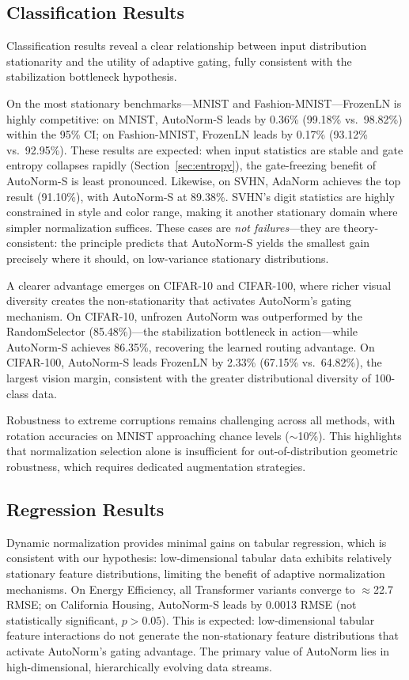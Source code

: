 \documentclass[final,3p,times,twocolumn]{elsarticle}
\begin{document}
\subsection{Classification Results}
\label{sec:bottleneck}

Classification results reveal a clear relationship between input
distribution stationarity and the utility of adaptive gating, fully
consistent with the stabilization bottleneck hypothesis.

On the most stationary benchmarks---MNIST and
Fashion-MNIST---FrozenLN is highly competitive: on MNIST, AutoNorm-S
leads by 0.36\% (99.18\% vs.\ 98.82\%) within the 95\% CI; on
Fashion-MNIST, FrozenLN leads by 0.17\% (93.12\% vs.\ 92.95\%). These
results are expected: when input statistics are stable and gate entropy
collapses rapidly (Section~\ref{sec:entropy}), the gate-freezing
benefit of AutoNorm-S is least pronounced. Likewise, on SVHN, AdaNorm
achieves the top result (91.10\%), with AutoNorm-S at 89.38\%.
SVHN's digit statistics are highly constrained in style and color
range, making it another stationary domain where simpler normalization
suffices. These cases are \textit{not failures}---they are theory-consistent:
the principle predicts that AutoNorm-S yields the smallest gain
precisely where it should, on low-variance stationary distributions.

A clearer advantage emerges on CIFAR-10 and CIFAR-100, where richer
visual diversity creates the non-stationarity that activates AutoNorm's
gating mechanism. On CIFAR-10, unfrozen AutoNorm was outperformed by
the RandomSelector (85.48\%)---the stabilization bottleneck in
action---while AutoNorm-S achieves 86.35\%, recovering the learned
routing advantage. On CIFAR-100, AutoNorm-S leads FrozenLN by 2.33\%
(67.15\% vs.\ 64.82\%), the largest vision margin, consistent with
the greater distributional diversity of 100-class data.

Robustness to extreme corruptions remains challenging across all
methods, with rotation accuracies on MNIST approaching chance levels
($\sim$10\%). This highlights that normalization selection alone is
insufficient for out-of-distribution geometric robustness, which
requires dedicated augmentation strategies.

\subsection{Regression Results}

Dynamic normalization provides minimal gains on tabular regression,
which is consistent with our hypothesis: low-dimensional tabular data
exhibits relatively stationary feature distributions, limiting the
benefit of adaptive normalization mechanisms.
On Energy Efficiency, all Transformer variants converge to
$\approx$22.7 RMSE; on California Housing, AutoNorm-S leads by 0.0013
RMSE (not statistically significant, $p > 0.05$). This is expected:
low-dimensional tabular feature interactions do not generate the
non-stationary feature distributions that activate AutoNorm's gating
advantage. The primary value of AutoNorm lies in high-dimensional,
hierarchically evolving data streams.
\end{document}
